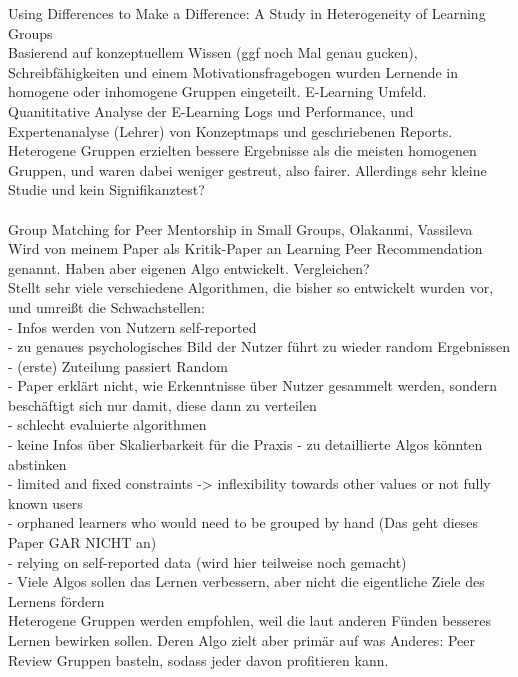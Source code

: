 \documentclass[nochapterpage,bigchapter,linedtoc,longdoc,colorback,accentcolor=tud3b,oneside]{tudreport}
\begin{document}
Using Differences to Make a Difference: A Study in Heterogeneity of Learning Groups \cite{manske2015using}\\
Basierend auf konzeptuellem Wissen (ggf noch Mal genau gucken), Schreibfähigkeiten und einem Motivationsfragebogen wurden Lernende in homogene oder inhomogene Gruppen eingeteilt. E-Learning Umfeld. Quanititative Analyse der E-Learning Logs und Performance, und Expertenanalyse (Lehrer) von Konzeptmaps und geschriebenen Reports. Heterogene Gruppen erzielten bessere Ergebnisse als die meisten homogenen Gruppen, und waren dabei weniger gestreut, also fairer. Allerdings sehr kleine Studie und kein Signifikanztest?\\
\\

Group Matching for Peer Mentorship in Small Groups, Olakanmi, Vassileva \cite{olakanmi2017group}\\
Wird von meinem Paper als Kritik-Paper an Learning Peer Recommendation genannt. Haben aber eigenen Algo entwickelt. Vergleichen?\\
Stellt sehr viele verschiedene Algorithmen, die bisher so entwickelt wurden vor, und umreißt die Schwachstellen:\\
- Infos werden von Nutzern self-reported\\
- zu genaues psychologisches Bild der Nutzer führt zu wieder random Ergebnissen\\
- (erste) Zuteilung passiert Random\\
- Paper erklärt nicht, wie Erkenntnisse über Nutzer gesammelt werden, sondern beschäftigt sich nur damit, diese dann zu verteilen\\
- schlecht evaluierte algorithmen\\
- keine Infos über Skalierbarkeit für die Praxis - zu detaillierte Algos könnten abstinken\\
- limited and fixed constraints -> inflexibility towards other values or not fully known users\\
- orphaned learners who would need to be grouped by hand (Das geht dieses Paper GAR NICHT an)\\
- relying on self-reported data (wird hier teilweise noch gemacht)\\
- Viele Algos sollen das Lernen verbessern, aber nicht die eigentliche Ziele des Lernens fördern\\
Heterogene Gruppen werden empfohlen, weil die laut anderen Fünden besseres Lernen bewirken sollen. Deren Algo zielt aber primär auf was Anderes: Peer Review Gruppen basteln, sodass jeder davon profitieren kann.
\end{document}
